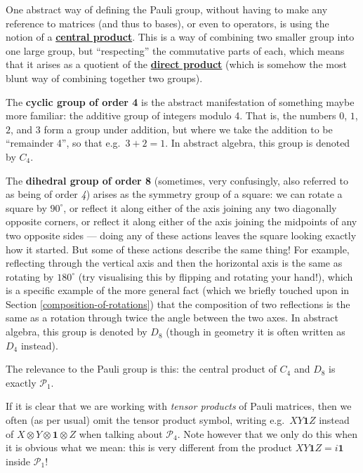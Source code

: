 \documentclass[fleqn]{article}
\newenvironment{technical}{\noindent}{\medskip}
\begin{document}
\begin{technical}
One abstract way of defining the Pauli group, without having to make any reference to matrices (and thus to bases), or even to operators, is using the notion of a \href{https://en.wikipedia.org/wiki/Central_product}{\textbf{central product}}.
This is a way of combining two smaller group into one large group, but ``respecting'' the commutative parts of each, which means that it arises as a quotient of the \href{https://en.wikipedia.org/wiki/Direct_product_of_groups}{\textbf{direct product}} (which is somehow the most blunt way of combining together two groups).

The \textbf{cyclic group of order 4} is the abstract manifestation of something maybe more familiar: the additive group of integers modulo 4.
That is, the numbers \(0\), \(1\), \(2\), and \(3\) form a group under addition, but where we take the addition to be ``remainder 4'', so that e.g.~\(3+2=1\).
In abstract algebra, this group is denoted by \(C_4\).

The \textbf{dihedral group of order 8} (sometimes, very confusingly, also referred to as being of order \emph{4}) arises as the symmetry group of a square: we can rotate a square by \(90^\circ\), or reflect it along either of the axis joining any two diagonally opposite corners, or reflect it along either of the axis joining the midpoints of any two opposite sides --- doing any of these actions leaves the square looking exactly how it started.
But some of these actions describe the same thing!
For example, reflecting through the vertical axis and then the horizontal axis is the same as rotating by \(180^\circ\) (try visualising this by flipping and rotating your hand!), which is a specific example of the more general fact (which we briefly touched upon in Section \ref{composition-of-rotations}) that the composition of two reflections is the same as a rotation through twice the angle between the two axes.
In abstract algebra, this group is denoted by \(D_8\) (though in geometry it is often written as \(D_4\) instead).

The relevance to the Pauli group is this: the central product of \(C_4\) and \(D_8\) is exactly \(\mathcal{P}_1\).

\end{technical}

If it is clear that we are working with \emph{tensor products} of Pauli matrices, then we often (as per usual) omit the tensor product symbol, writing e.g.~\(XY\mathbf{1}Z\) instead of \(X\otimes Y\otimes\mathbf{1}\otimes Z\) when talking about \(\mathcal{P}_4\).
Note however that we only do this when it is obvious what we mean: this is very different from the product \(XY\mathbf{1}Z=i\mathbf{1}\) inside \(\mathcal{P}_1\)!
\end{document}
